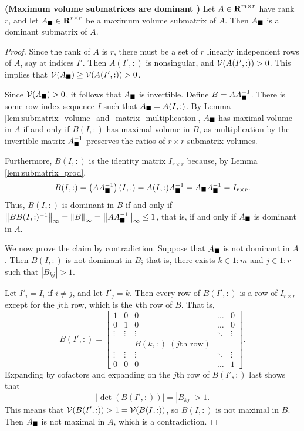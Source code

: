 \documentclass{article}
\begin{document}
	\begin{thm} \textnormal{\bf(Maximum volume submatrices are dominant \cite{goreinov_2010})}
		\label{thm:maxvol_implies_dominant}
		Let $A \in \textnormal{\bf R}^{m\times r}$ have rank $r$, and let $A_\blacksquare \in \textnormal{\bf R}^{r\times r}$ be a maximum volume submatrix of $A$. Then $A_\blacksquare$ is a dominant submatrix of $A$.
		\begin{proof}
			Since the rank of $A$ is $r$, there must be a set of $r$ linearly independent rows of $A$, say at indices $I'$. Then $A(I',:)$ is nonsingular, and $\mathcal{V}(A(I',:)) > 0$. This implies that $\mathcal{V}(A_\blacksquare) \ge \mathcal{V}(A(I',:)) > 0$.
			
			Since $\mathcal{V}(A_\blacksquare) > 0$, it follows that $A_\blacksquare$ is invertible. Define $B = AA_\blacksquare^{-1}$. There is some row index sequence $I$ such that $A_\blacksquare = A(I,:)$. By Lemma \ref{lem:submatrix_volume_and_matrix_multiplication}, $A_\blacksquare$ has maximal volume in $A$ if and only if $B(I,:)$ has maximal volume in $B$, as multiplication by the invertible matrix $A_\blacksquare^{-1}$ preserves the ratios of $r\times r$ submatrix volumes.
			
			Furthermore, $B(I,:)$ is the identity matrix $I_{r\times r}$ because, by Lemma \ref{lem:submatrix_prod},
			\begin{equation}
				B(I,:) = \left(AA_\blacksquare^{-1}\right)(I,:) = A(I,:)A_\blacksquare^{-1} = A_\blacksquare A_\blacksquare^{-1} = I_{r\times r}.
			\end{equation}
			Thus, $B(I,:)$ is dominant in $B$ if and only if $\left\lVert BB(I,:)^{-1} \right\rVert_\infty = \left\lVert B \right\rVert_\infty = \left\lVert AA_\blacksquare^{-1} \right\rVert_\infty\le 1$, that is, if and only if $A_\blacksquare$ is dominant in $A$.
			
			We now prove the claim by contradiction. Suppose that $A_\blacksquare$ is not dominant in $A$. Then $B(I,:)$ is not dominant in $B$; that is, there exists $k \in 1:m$ and $j \in 1:r$ such that $|B_{kj}| > 1$. 
			
			Let $I'_i = I_i$ if $i \ne j$, and let $I'_j = k$. Then every row of $B(I',:)$ is a row of $I_{r\times r}$ except for the $j$th row, which is the $k$th row of $B$. That is,
			\begin{equation}
				B(I',:) = \left[\begin{matrix}
					1 & 0 & 0&\dots & 0 \\
					0 & 1 & 0 & \dots & 0 \\
					\vdots & \vdots &\vdots & \ddots & \vdots \\
					&  & B(k, :) \;(j\text{th row})& & \\
					\vdots & \vdots &\vdots & \ddots & \vdots \\
					0 & 0 & 0 & \dots & 1
				\end{matrix}\right].
			\end{equation}
			Expanding by cofactors and expanding on the $j$th row of $B(I',:)$ last shows that
			\begin{equation}
				|\det(B(I',:))| = |B_{kj}| > 1.
			\end{equation}
			This means that $\mathcal{V}(B(I',:)) > 1 = \mathcal{V}(B(I,:))$, so $B(I,:)$ is not maximal in $B$. Then $A_\blacksquare$ is not maximal in $A$, which is a contradiction.
			

\end{proof}
\end{thm}
\end{document}
